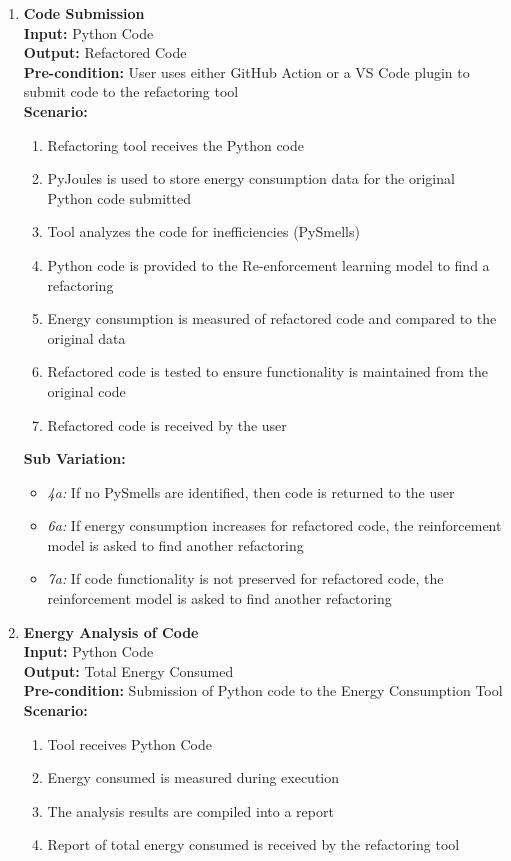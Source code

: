 \documentclass[12pt]{article}
\begin{document}
\begin{enumerate}[label={\bf BUC \arabic*:}, wide=0pt, font=\itshape]
  \item {\bf Code Submission} \\[2mm]
    \textbf{Input:} Python Code \\
    \textbf{Output:} Refactored Code \\
    \textbf{Pre-condition:} User uses either GitHub Action or a VS
    Code plugin to submit code to the refactoring tool \\[2mm]
    \textbf{Scenario:}
    \begin{enumerate}[label=\arabic*.]
      \item Refactoring tool receives the Python code
      \item PyJoules is used to store energy consumption data for the
        original Python code submitted
      \item Tool analyzes the code for inefficiencies (PySmells)
      \item Python code is provided to the Re-enforcement learning
        model to find a refactoring
      \item Energy consumption is measured of refactored code and
        compared to the original data
      \item Refactored code is tested to ensure functionality is
        maintained from the original code
      \item Refactored code is received by the user
    \end{enumerate}
    \textbf{Sub Variation: }
    \begin{itemize}
      \item \textit{4a:} If no PySmells are identified, then code is
        returned to the user
      \item \textit{6a:} If energy consumption increases for
        refactored code, the reinforcement model is asked to find
        another refactoring
      \item \textit{7a:} If code functionality is not preserved for
        refactored code, the reinforcement model is asked to find
        another refactoring
    \end{itemize}

  \item {\bf Energy Analysis of Code}\\[2mm]
    \textbf{Input:} Python Code \\
    \textbf{Output:} Total Energy Consumed \\
    \textbf{Pre-condition:} Submission of Python code to the Energy
    Consumption Tool \\[2mm]
    \textbf{Scenario: }
    \begin{enumerate}[label=\arabic*.]
      \item Tool receives Python Code
      \item Energy consumed is measured during execution
      \item The analysis results are compiled into a report
      \item Report of total energy consumed is received by the refactoring tool
    \end{enumerate}


\end{enumerate}
\end{document}
